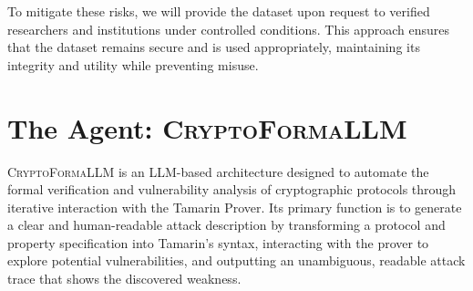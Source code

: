 To mitigate these risks, we will provide the dataset upon request to verified researchers and institutions under controlled conditions. This approach ensures that the dataset remains secure and is used appropriately, maintaining its integrity and utility while preventing misuse.

\section{The Agent: \textsc{CryptoFormaLLM}}
\label{sec:cryptoformallm}
\textsc{CryptoFormaLLM} is an LLM-based architecture designed to automate the formal verification and vulnerability analysis of cryptographic protocols through iterative interaction with the Tamarin Prover. Its primary function is to generate a clear and human-readable attack description by transforming a protocol and property specification into Tamarin's syntax, interacting with the prover to explore potential vulnerabilities, and outputting an unambiguous, readable attack trace that shows the discovered weakness.

